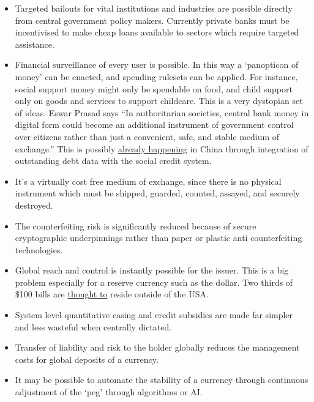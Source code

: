 \begin{itemize}
\begin{itemize}
\item Targeted bailouts for vital institutions and industries are possible directly from central government policy makers. Currently private banks must be incentivised to make cheap loans available to sectors which require targeted assistance.
\item Financial surveillance of every user is possible. In this way a `panopticon of money' can be enacted, and spending rulesets can be applied. For instance, social support money might only be spendable on food, and child support only on goods and services to support childcare. This is a very dystopian set of ideas. Eswar Prasad says ``In authoritarian societies, central bank money in digital form could become an additional instrument of government control over citizens rather than just a convenient, safe, and stable medium of exchange\cite{prasad2021future}.'' This is possibly \href{https://twitter.com/WallStreetSilv/status/1581378124452753408}{already happening} in China through integration of outstanding debt data with the social credit system.  
\item It's a virtually cost free medium of exchange, since there is no physical instrument which must be shipped, guarded, counted, assayed, and securely destroyed.
\item The counterfeiting risk is significantly reduced because of secure cryptographic underpinnings rather than paper or plastic anti counterfeiting technologies.
\item Global reach and control is instantly possible for the issuer. This is a big problem especially for a reserve currency such as the dollar. Two thirds of \$100 bills are \href{https://www.federalreserve.gov/pubs/ifdp/2012/1058/default.htm}{thought to} reside outside of the USA.
\item System level quantitative easing and credit subsidies are made far simpler and less wasteful when centrally dictated.
\item Transfer of liability and risk to the holder globally reduces the management costs for global deposits of a currency. 
\item It may be possible to automate the stability of a currency through continuous adjustment of the `peg' through algorithms or AI.
\end{itemize}


\end{itemize}
